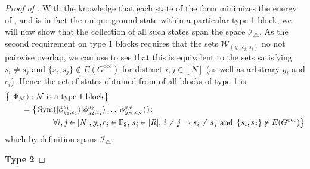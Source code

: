 \documentclass[../thesis-main/thesis-main]{subfiles}
\begin{document}
\begin{proof}[Proof of \protect{}]
With the knowledge that each state of the form  minimizes the energy of , and is in fact the unique ground state within a particular type 1 block, we will now show that the collection of all such states span the space $\mathcal{I}_{\triangle}$.  As the second requirement on type 1 blocks requires that the sets $\mathcal{W}_{(y_i,c_i,s_i)}$ no not pairwise overlap, we can use  to see that this is equivalent to the sets satisfying $s_{i}\neq s_{j}$ and $\{s_{i},s_{j}\}\notin E(G^{\text{occ}})$ for distinct $i,j\in[N]$ (as well as arbitrary $y_i$ and $c_i$). Hence the set of states  obtained from of all blocks of type 1 is 
\begin{align}
  &\big\{ |\mspace{2mu} \Phi_\mathcal{N} \mspace{2mu} \rangle : \mathcal{N} \text{ is a type 1 block}\big\}\nonumber\\
  &\qquad=\big\{ \operatorname{Sym}(|\phi_{y_{1},c_{1}}^{s_{1}}\rangle|\phi_{y_{2},c_{2}}^{s_{2}}\rangle\ldots|\phi_{y_{N},c_{N}}^{s_{N}}\rangle)\colon \nonumber\\
  &\qquad\qquad\qquad\forall i,j\in [N], y_{i},c_{i}\in\mathbb{F}_2,\, s_{i}\in[R],\, i\neq j \Rightarrow s_{i}\neq s_{j}\text{ and }\,\{s_{i},s_{j}\}\notin E(G^{\text{occ}})\big\} 
\end{align}
which by definition spans $\mathcal{I}_{\triangle}$.

\medskip

\noindent \textbf{Type 2}

\smallskip


\end{proof}
\end{document}
